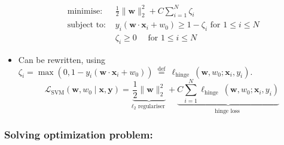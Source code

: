 \documentclass[11pt, %
	oneside, %
	english, %
	onehalfspacing, %
	parskip, %
	]{article} %
\theoremstyle{definition}
\begin{document}
\begin{itemize}
	 \begin{equation*}
		\begin{array}{ll}
			\text { minimise: } & \frac{1}{2}\|\mathbf{w}\|_2^2+C \sum_{i=1}^N \zeta_i \\
			\text { subject to: } & y_i\left(\mathbf{w} \cdot \mathbf{x}_i+w_0\right) \geq 1-\zeta_i \text { for } 1 \leq i \leq N \\
			& \zeta_i \geq 0 \quad \text { for } 1 \leq i \leq N
			\end{array}
	 \end{equation*}
	 \item Can be rewritten, using $\zeta_i=\max \left(0,1-y_i\left(\mathbf{w} \cdot \mathbf{x}_i+w_0\right)\right) \stackrel{\text { def }}{=} \ell_{\text {hinge }}\left(\mathbf{w}, w_0 ; \mathbf{x}_i, y_i\right)$.
	 \begin{equation*}
		\mathcal{L}_{\mathrm{SVM}}\left(\mathbf{w}, w_0 \mid \mathbf{x}, \mathbf{y}\right)=\underbrace{\frac{1}{2}\|\mathbf{w}\|_2^2}_{\ell_2 \text { regulariser }}+\underbrace{C \sum_{i=1}^N \ell_{\text {hinge }}\left(\mathbf{w}, w_0 ; \mathbf{x}_i, y_i\right)}_{\text {hinge loss }}
	 \end{equation*}
\end{itemize}

\subsubsection*{Solving optimization problem:}
\end{document}
